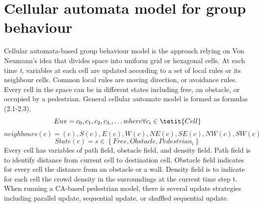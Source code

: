 \documentclass[a4paper,11pt,phdthesis,singlespace,twoside]{cssethesis}
\begin{document}
\section{Cellular automata model for group behaviour}
Cellular automata-based group behaviour model is the approach relying on Von Neumann's idea that divides space into uniform grid or hexagonal cells. At each time \textit{t}, variables at each cell are updated according to a set of local rules or its neighbour cells. Common local rules are moving direction, or avoidance rules. Every cell in the space can be in different states including free, an obstacle, or occupied by a pedestrian. General cellular automate model is formed as formulas (2.1-2.3).
\begin{equation}
Env = c_{0},c_{1},c_{2},c_{3,},\ldots where\/ \forall c_{i} \in \tetit{Cell}
\end{equation}
\begin{equation}
neighbours(c) = {(c),S(c),E(c),W(c),NE(c),SE (c),NW(c),SW(c)}
\end{equation}
\begin{equation}
State(c)= s \in \left \{Free,Obstacle,Pedestrian_{i}\right \}
\end{equation}
Every cell has variables of path field, obstacle field, and density field. Path field is to identify distance from current cell to destination cell. Obstacle field indicates for every cell the distance from an obstacle or a wall. Density field is to indicate for each cell the crowd density in the surroundings at the current time step t. When running a CA-based pedestrian model, there is several update strategies including parallel update, sequential update, or shuffled sequential update. 
\end{document}
